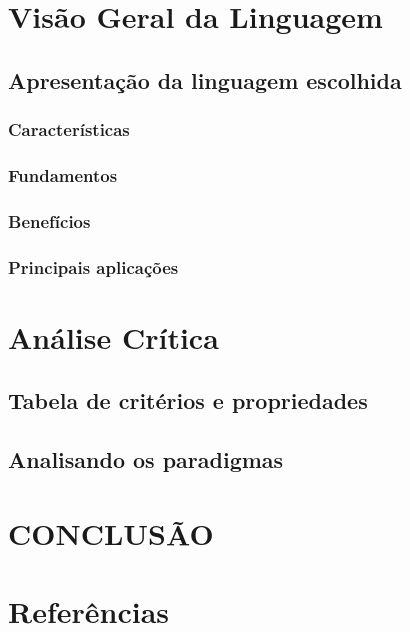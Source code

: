 \documentclass[rel_mlp]{iiufrgs}
\begin{document}
%
\chapter{Visão Geral da Linguagem}

\section{Apresentação da linguagem escolhida}

\subsection{Características}

\subsection{Fundamentos}

\subsection{Benefícios}

\subsection{Principais aplicações}

%
\chapter{Análise Crítica}

\section{Tabela de critérios e propriedades}

\section{Analisando os paradigmas}

%
\chapter{CONCLUSÃO}

%
\chapter{Referências}
%




\end{document}
